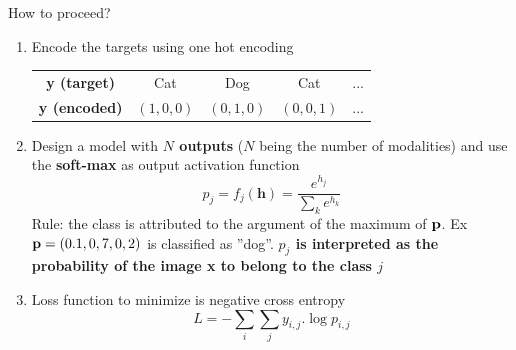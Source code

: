 \documentclass[handout]{beamer}
\begin{document}
\begin{frame}{How to proceed?}

\begin{enumerate}[<+->]
    \item Encode the targets using one hot encoding
    \begin{table}[]
    \centering
    \begin{tabular}{ccccc}
    
        {\bf y (target)} & Cat & Dog & Cat & ...\\
         {\bf y (encoded)} & $(1,0,0)$ & $(0,1,0)$ & $(0,0,1)$ & ...\\
        
    \end{tabular}
\end{table}
    \item Design a model with \alert{\bf $N$ outputs } ($N$ being the number of modalities) and use the \alert{\bf soft-max} as output activation function
    $$
       p_j=f_j(\mathbf{h}) = \frac{e^{h_j}}{\sum_k e^{h_k}}
    $$
    Rule: the class is attributed to the argument of the maximum of ${\bf p}$. Ex ${\bf p} = (0.1, 0,7, 0,2)$ is classified as ''dog''.
    \alert{\bf $p_j$ is interpreted as the probability of the image x to belong to the class $j$}
    \item Loss function to minimize is negative cross entropy
 $$L = -\sum_i \sum_j y_{i,j}.\log{p_{i,j}}$$
\end{enumerate}    
\end{frame}
\end{document}
